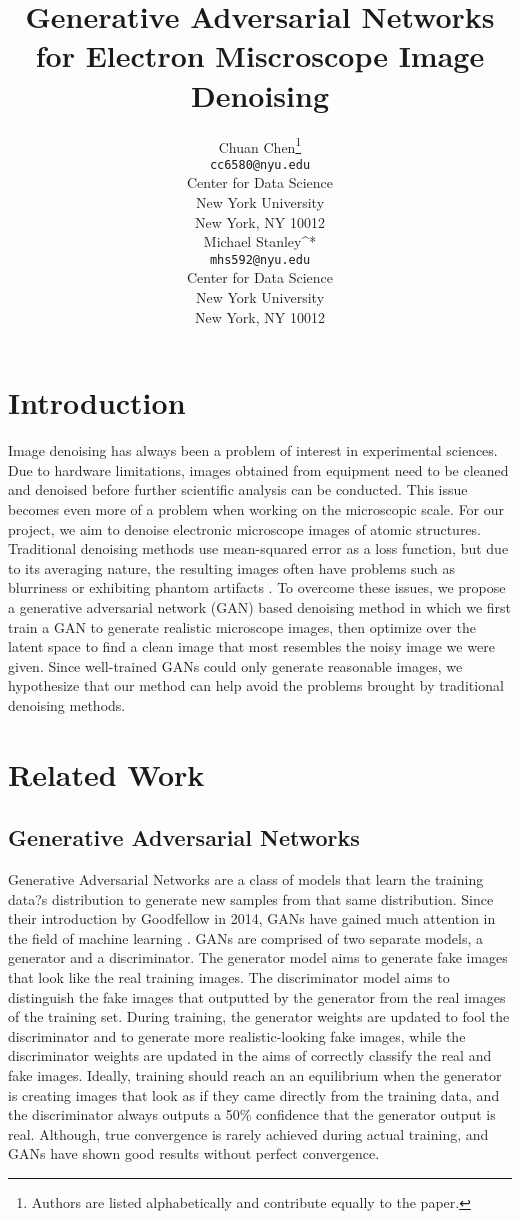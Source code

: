 \documentclass{article}
\title{Generative Adversarial Networks for Electron Miscroscope Image Denoising}
\author{%
  Chuan Chen\thanks{Authors are listed alphabetically and contribute equally to the paper.} \\
  \texttt{cc6580@nyu.edu} \\
  Center for Data Science\\
  New York University\\
  New York, NY 10012 \\

   \And
  Michael Stanley^* \\
  \texttt{mhs592@nyu.edu} \\
  Center for Data Science\\
  New York University\\
  New York, NY 10012 \\
}
\begin{document}
\maketitle

\setcounter{page}{1}
\section{Introduction}

Image denoising has always been a problem of interest in experimental sciences. Due to hardware limitations, images obtained from equipment need to be cleaned and denoised before further scientific analysis can be conducted. This issue becomes even more of a problem when working on the microscopic scale. For our project, we aim to denoise electronic microscope images of atomic structures. Traditional denoising methods use mean-squared error as a loss function, but due to its averaging nature, the resulting images often have problems such as blurriness or exhibiting phantom artifacts \cite{mohan19}. To overcome these issues, we propose a generative adversarial network (GAN) based denoising method in which we first train a GAN to generate realistic microscope images, then optimize over the latent space to find a clean image that most resembles the noisy image we were given. Since well-trained GANs could only generate reasonable images, we hypothesize that our method can help avoid the problems brought by traditional denoising methods.


\section{Related Work}

\subsection{Generative Adversarial Networks}
Generative Adversarial Networks are a class of models that learn the training data?s distribution to generate new samples from that same distribution. Since their introduction by Goodfellow in 2014, GANs have gained much attention in the field of machine learning \cite{Goodfellow}. GANs are comprised of two separate models, a generator and a discriminator. The generator model aims to generate fake images that look like the real training images. The discriminator model aims to distinguish the fake images that outputted by the generator from the real images of the training set. During training, the generator weights are updated to fool the discriminator and to generate more realistic-looking fake images, while the discriminator weights are updated in the aims of correctly classify the real and fake images. Ideally, training should reach an an equilibrium when the generator is creating images that look as if they came directly from the training data, and the discriminator always outputs a 50\% confidence that the generator output is real. Although, true convergence is rarely achieved during actual training, and GANs have shown good results without perfect convergence. 
\end{document}
